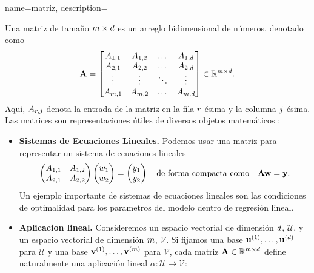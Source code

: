 {
    name={matriz},
    description={Una matriz de tamaño $m \times d$ es un arreglo bidimensional de números, 
        denotado como 
        $$
        {\bf A} = \begin{bmatrix}
        A_{1,1} & A_{1,2} & \dots  & A_{1,d} \\
        A_{2,1} & A_{2,2} & \dots  & A_{2,d} \\
        \vdots  & \vdots  & \ddots & \vdots \\
        A_{m,1} & A_{m,2} & \dots  & A_{m,d}
        \end{bmatrix} \in \mathbb{R}^{m \times d}.
        $$
        Aquí, $A_{r,j}$ denota la entrada de la matriz en la fila $r$-ésima y la 
        columna $j$-ésima. Las matrices son representaciones útiles de diversos objetos matemáticos \cite{StrangLinAlg2016}:
        \begin{itemize}
            \item {\bf Sistemas de Ecuaciones Lineales.} Podemos usar una matriz para representar un sistema de ecuaciones lineales 
            $$ \begin{pmatrix}
            A_{1,1} & A_{1,2} \\
            A_{2,1} & A_{2,2}
            \end{pmatrix}
            \begin{pmatrix}
            w_1 \\
            w_2
            \end{pmatrix}
            =\begin{pmatrix}
            y_1 \\
            y_2
            \end{pmatrix}
            \quad \text{de forma compacta como} \quad {\bf A} {\bf w} = {\bf y}.
            $$
            Un ejemplo importante de sistemas de ecuaciones lineales son las condiciones de optimalidad para los 
            parametros del modelo dentro de regresión lineal. 
            \item {\bf Aplicacion lineal.} 
            Consideremos un espacio vectorial de dimensión $d$, $\mathcal{U}$, y un espacio vectorial de dimensión $m$, $\mathcal{V}$. 
            Si fijamos una base $\mathbf{u}^{(1)},\ldots,\mathbf{u}^{(d)}$ para $\mathcal{U}$ y una base $\mathbf{v}^{(1)},\ldots,\mathbf{v}^{(m)}$ 
            para $\mathcal{V}$, cada matriz ${\bf A} \in \mathbb{R}^{m \times d}$ define naturalmente una aplicación lineal $\alpha: \mathcal{U} \rightarrow \mathcal{V}$:

\end{itemize}}}
